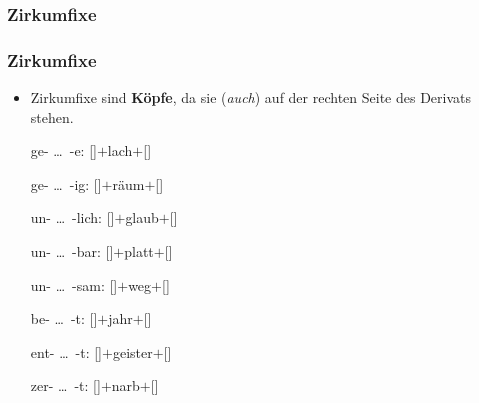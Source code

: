\subsubsection{Zirkumfixe}
\begin{frame}
\frametitle{Zirkumfixe}

\begin{itemize}
	\item Zirkumfixe sind \textbf{Köpfe}, da sie (\emph{auch}) auf der rechten Seite des Derivats stehen.
	
	\ea
	\ea ge- \dots\ -e: []$+$lach$+$[]
	
	\ex ge- \dots\ -ig: []$+$räum$+$[]
	
	\ex un- \dots\ -lich: []$+$glaub$+$[]
	
	\ex un- \dots\ -bar: []$+$platt$+$[]
	
	\ex un- \dots\ -sam: 
	[]$+$weg$+$[]
	
	\ex be- \dots\ -t: 
	[]$+$jahr$+$[]
	
	\ex ent- \dots\ -t: 
	[]$+$geister$+$[]		
	
	\ex zer- \dots\ -t: 
	[]$+$narb$+$[]		
	\z 
	\z
\end{itemize}

\end{frame}


